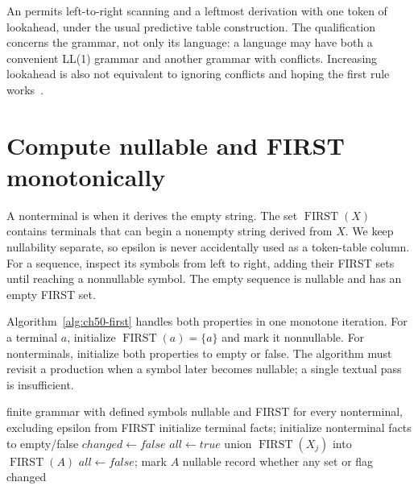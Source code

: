 An  permits left-to-right scanning and a leftmost derivation with one token of lookahead, under the usual predictive table construction.
The qualification concerns the grammar, not only its language: a language may have both a convenient LL(1) grammar and another grammar with conflicts.
Increasing lookahead is also not equivalent to ignoring conflicts and hoping the first rule works~\cite{grune-2008-parsing}.

\section{Compute nullable and FIRST monotonically}
\label{sec:ch50-first}

A nonterminal is  when it derives the empty string.
The set $\operatorname{FIRST}(X)$ contains terminals that can begin a nonempty string derived from $X$.
We keep nullability separate, so epsilon is never accidentally used as a token-table column.
For a sequence, inspect its symbols from left to right, adding their FIRST sets until reaching a nonnullable symbol.
The empty sequence is nullable and has an empty FIRST set.

Algorithm~\ref{alg:ch50-first} handles both properties in one monotone iteration.
For a terminal $a$, initialize $\operatorname{FIRST}(a)=\{a\}$ and mark it nonnullable.
For nonterminals, initialize both properties to empty or false.
The algorithm must revisit a production when a symbol later becomes nullable; a single textual pass is insufficient.

\begin{algorithm}[htbp]
\caption{Compute nullable flags and terminal FIRST sets to a fixed point.}
\label{alg:ch50-first}
\begin{pseudocode}
\Require finite grammar with defined symbols
\Ensure nullable and FIRST for every nonterminal, excluding epsilon from FIRST
\State initialize terminal facts; initialize nonterminal facts to empty/false
\Repeat
  \State $changed\gets false$
    \State $all\gets true$
      \State union $\operatorname{FIRST}(X_j)$ into $\operatorname{FIRST}(A)$
        \State $all\gets false$; \Break
      \EndIf
    \EndFor
      \State mark $A$ nullable
    \EndIf
    \State record whether any set or flag changed
  \EndFor
{}
\end{pseudocode}
\end{algorithm}

